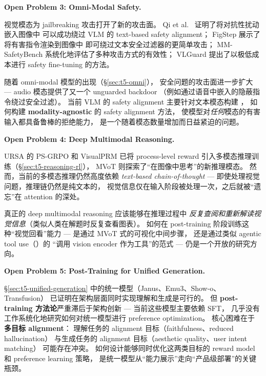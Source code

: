 \begin{openproblembox}
\textbf{Open Problem 3: Omni-Modal Safety.}

视觉模态为 jailbreaking 攻击打开了新的攻击面。
Qi et al.\ \cite{qi2023visual} 证明了将对抗性扰动嵌入图像中
可以成功绕过 VLM 的 text-based safety alignment；
FigStep \cite{gong2023figstep} 展示了将有害指令渲染到图像中
即可绕过文本安全过滤器的更简单攻击；
MM-SafetyBench \cite{liu2023mm-safetybench} 系统化地评估了多种攻击方式的有效性；
VLGuard \cite{zong2024vlguard} 提出了以极低成本进行 safety fine-tuning 的方法。

随着 omni-modal 模型的出现（\S\ref{sec:t5-omni}），
安全问题的攻击面进一步扩大 ---
audio 模态提供了又一个 unguarded backdoor
（例如通过语音中嵌入的隐蔽指令绕过安全过滤）。
当前 VLM 的 safety alignment 主要针对文本模态构建
，
如何构建 \textbf{modality-agnostic} 的 safety alignment 方法，
使模型对\textit{任何}模态的有害输入都具备鲁棒的拒绝能力，
是一个随着模态数量增加而日益紧迫的问题。
\end{openproblembox}

\begin{openproblembox}
\textbf{Open Problem 4: Deep Multimodal Reasoning.}

URSA 的 PS-GRPO 和 VisualPRM 已将 process-level reward
引入多模态推理训练（\S\ref{sec:t5-reasoning-rl}），
MVoT 则探索了``在图像中思考''的新推理模态。
然而，当前的多模态推理仍然高度依赖 \textit{text-based chain-of-thought} ---
即使处理视觉问题，推理链仍然是纯文本的，
视觉信息仅在输入阶段被处理一次，之后就被``遗忘''在 attention 的深处。

真正的 deep multimodal reasoning 应该能够在推理过程中
\textit{反复查阅和重新解读视觉信息}（类似人类在解题时反复查看图表）。
如何在 post-training 阶段训练这种``视觉回看''能力 ---
是通过 MVoT 式的可视化中间步骤，
还是通过类似 agentic tool use（）的
``调用 vision encoder 作为工具''的范式 ---
仍是一个开放的研究方向。
\end{openproblembox}

\begin{openproblembox}
\textbf{Open Problem 5: Post-Training for Unified Generation.}

\S\ref{sec:t5-unified-generation} 中的统一模型（Janus、Emu3、Show-o、Transfusion）
已证明在架构层面同时实现理解和生成是可行的。
但 \textbf{post-training 方法论}严重滞后于架构创新 ---
当前这些模型主要依赖 SFT，
几乎没有工作系统化地研究如何对统一模型进行 preference optimization。
核心困难在于 \textbf{多目标 alignment}：
理解任务的 alignment 目标（faithfulness、reduced hallucination）
与生成任务的 alignment 目标（aesthetic quality、user intent matching）
可能存在冲突。
如何设计能够同时优化这两类目标的 reward model 和 preference learning 策略，
是统一模型从``能力展示''走向``产品级部署''的关键瓶颈。
\end{openproblembox}

